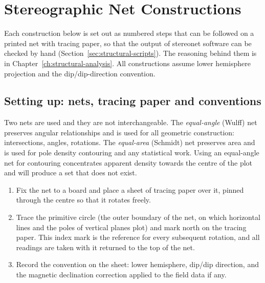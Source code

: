 \chapter{Stereographic Net Constructions}
\label{app:stereonet}

Each construction below is set out as numbered steps that can be followed on a
printed net with tracing paper, so that the output of stereonet software can
be checked by hand (Section~\ref{sec:structural-scripts}). The reasoning behind them is in
Chapter~\ref{ch:structural-analysis}. All constructions assume lower
hemisphere projection and the dip/dip-direction convention.

\section{Setting up: nets, tracing paper and conventions}
\label{sec:net-setup}

Two nets are used and they are not interchangeable. The \emph{equal-angle}
(Wulff) net preserves angular relationships and is used for all geometric
construction: intersections, angles, rotations. The \emph{equal-area}
(Schmidt) net preserves area and is used for pole density contouring and any
statistical work. Using an equal-angle net for contouring concentrates
apparent density towards the centre of the plot and will produce a set that
does not exist.

\begin{enumerate}
  \item Fix the net to a board and place a sheet of tracing paper over it,
        pinned through the centre so that it rotates freely.
  \item Trace the primitive circle (the outer boundary of the net, on
        which horizontal lines and the poles of vertical planes plot) and
        mark north on the tracing paper. This
        index mark is the reference for every subsequent rotation, and all
        readings are taken with it returned to the top of the net.
  \item Record the convention on the sheet: lower hemisphere, dip/dip
        direction, and the magnetic declination correction applied to the
        field data if any.
\end{enumerate}

